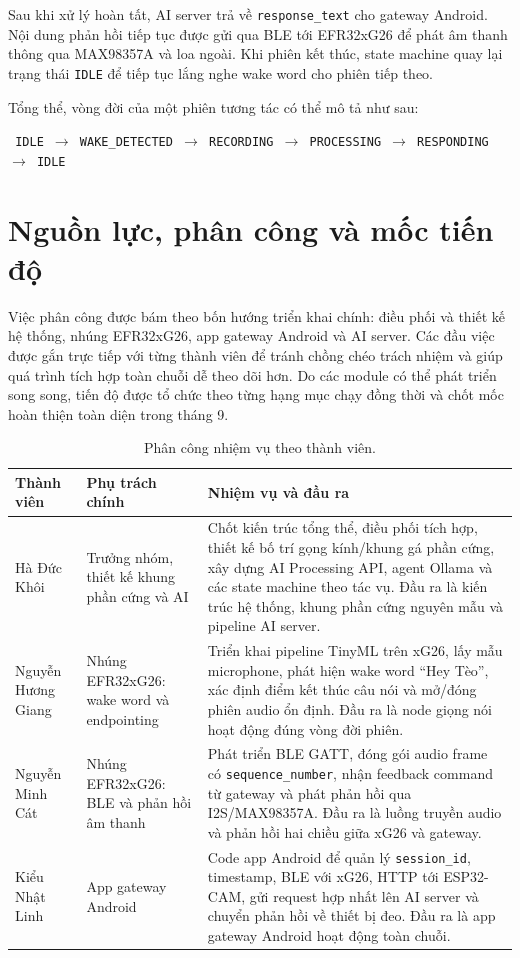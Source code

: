 \documentclass[11pt,a4paper]{article}
\begin{document}
Sau khi xử lý hoàn tất, AI server trả về \texttt{response\_text} cho gateway Android. Nội dung phản hồi tiếp tục được gửi qua BLE tới EFR32xG26 để phát âm thanh thông qua MAX98357A và loa ngoài. Khi phiên kết thúc, state machine quay lại trạng thái \texttt{IDLE} để tiếp tục lắng nghe wake word cho phiên tiếp theo.

Tổng thể, vòng đời của một phiên tương tác có thể mô tả như sau:

\begin{center}
\texttt{
IDLE
$\rightarrow$
WAKE\_DETECTED
$\rightarrow$
RECORDING
$\rightarrow$
PROCESSING
$\rightarrow$
RESPONDING
$\rightarrow$
IDLE
}
\end{center}
\section{Nguồn lực, phân công và mốc tiến độ}
Việc phân công được bám theo bốn hướng triển khai chính: điều phối và thiết kế hệ thống, nhúng EFR32xG26, app gateway Android và AI server. Các đầu việc được gắn trực tiếp với từng thành viên để tránh chồng chéo trách nhiệm và giúp quá trình tích hợp toàn chuỗi dễ theo dõi hơn. Do các module có thể phát triển song song, tiến độ được tổ chức theo từng hạng mục chạy đồng thời và chốt mốc hoàn thiện toàn diện trong tháng 9.

\begin{table}[H]
\centering
\caption{Phân công nhiệm vụ theo thành viên.}
\small
\begin{tabularx}{\textwidth}{p{3.0cm}p{3.8cm}Y}
\toprule
\textbf{Thành viên} & \textbf{Phụ trách chính} & \textbf{Nhiệm vụ và đầu ra} \\
\midrule
Hà Đức Khôi & Trưởng nhóm, thiết kế khung phần cứng và AI & Chốt kiến trúc tổng thể, điều phối tích hợp, thiết kế bố trí gọng kính/khung gá phần cứng, xây dựng AI Processing API, agent Ollama và các state machine theo tác vụ. Đầu ra là kiến trúc hệ thống, khung phần cứng nguyên mẫu và pipeline AI server. \\
Nguyễn Hương Giang & Nhúng EFR32xG26: wake word và endpointing & Triển khai pipeline TinyML trên xG26, lấy mẫu microphone, phát hiện wake word ``Hey Tèo'', xác định điểm kết thúc câu nói và mở/đóng phiên audio ổn định. Đầu ra là node giọng nói hoạt động đúng vòng đời phiên. \\
Nguyễn Minh Cát & Nhúng EFR32xG26: BLE và phản hồi âm thanh & Phát triển BLE GATT, đóng gói audio frame có \texttt{sequence\_number}, nhận feedback command từ gateway và phát phản hồi qua I2S/MAX98357A. Đầu ra là luồng truyền audio và phản hồi hai chiều giữa xG26 và gateway. \\
Kiểu Nhật Linh & App gateway Android & Code app Android để quản lý \texttt{session\_id}, timestamp, BLE với xG26, HTTP tới ESP32-CAM, gửi request hợp nhất lên AI server và chuyển phản hồi về thiết bị đeo. Đầu ra là app gateway Android hoạt động toàn chuỗi. \\
\bottomrule
\end{tabularx}
\end{table}
\end{document}
